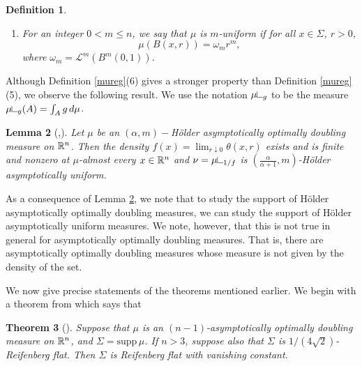 \documentclass[11pt]{article}
\newtheorem{theorem}{Theorem}[section]
\newtheorem{lemma}[theorem]{Lemma}
\newtheorem{definition}[theorem]{Definition}
\theoremstyle{definition}
\numberwithin{equation}{section}
\newcommand{\cL}{\mathcal{L}}
\newcommand{\supp}{\mathrm{supp\,}}
\newcommand{\sleq}{\leqslant}
\newcommand{\res}{\hbox{{\vrule height .22cm}{\leaders\hrule\hskip .2cm}}}
\begin{document}
\begin{definition}
\begin{enumerate}[(1)]
\begin{equation}
 \item For $\alpha >0$ and an integer $0<m\sleq n$, we say $\mu$ is \emph{$(\alpha,m)$-H\"older asymptotically uniform} if for each compact set $K\subseteq \Sigma$, there exist a constant $C_K$ and a radius $r_0>0$ such that for all $x\in K$ and $0<r\sleq r_0$,
     \begin{equation}
     \left|\frac{\mu(B(x,r))}{\omega_m r^m}-1\right|\sleq C_K r^\alpha,
     \end{equation}
where $\omega_m = \cL^m(B^m(0,1))$.
 \item For an integer $0<m\sleq n$, we say that $\mu$ is \emph{$m$-uniform} if for all $x\in \Sigma$, $r>0$,
\begin{equation}
\mu(B(x,r)) = \omega_m r^m,
\end{equation}
where $\omega_m = \cL^m(B^m(0,1))$.

 \end{enumerate}
 \end{definition}

Although Definition \ref{mureg}(6) gives a stronger property than Definition \ref{mureg}(5), we observe the following result. We use the notation $\mu\res_g$ to be the measure $\mu\res_g(A) = \int_A g \,d\mu$.

\begin{lemma}[\cite{DKT},\cite{PTT}]\label{HAL}
 Let $\mu$ be an $(\alpha,m)-$H\"older asymptotically optimally doubling measure on $\mathbb{R}^n$. Then the density $f(x) = \lim_{r\downarrow0} \theta(x,r)$ exists and is finite and nonzero at $\mu$-almost every $x\in \mathbb{R}^n$ and $\nu = \mu\res_{1/f}$ is $(\frac{\alpha}{\alpha+1},m)$-H\"older asymptotically uniform.
\end{lemma}

As a consequence of Lemma \ref{HAL}, we note that to study the support of H\"older asymptotically optimally doubling measures, we can study the support of H\"older asymptotically uniform measures. We note, however, that this is not true in general for asymptotically optimally doubling measures. That is, there are asymptotically optimally doubling measures whose measure is not given by the density of the set.


We now give precise statements of the theorems mentioned earlier. We begin with a theorem from \cite{DKT} which says that 

\begin{theorem}[\cite{DKT}]\label{DKTaod}
Suppose that $\mu$ is an $(n-1)$-asymptotically optimally doubling measure on $\mathbb{R}^n$, and $\Sigma = \supp \mu$. If $n>3$, suppose also that $\Sigma$ is $1/(4\sqrt 2)$-Reifenberg flat. Then $\Sigma$ is Reifenberg flat with vanishing constant.
\end{theorem}
\end{document}
